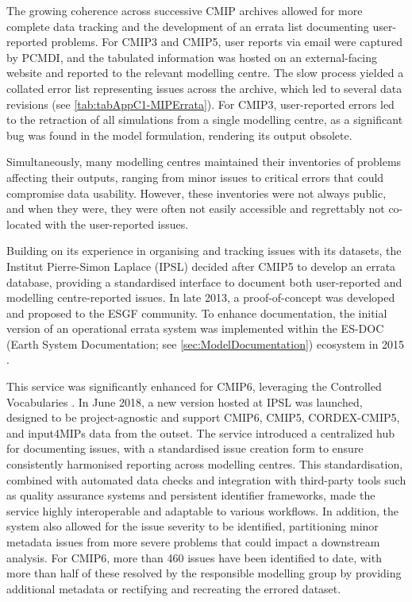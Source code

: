 \documentclass[manuscript]{copernicus}
\begin{document}
The growing coherence across successive CMIP archives allowed for more complete data tracking and the development of an errata list documenting user-reported problems. For CMIP3 and CMIP5, user reports via email were captured by PCMDI, and the tabulated information was hosted on an external-facing website and reported to the relevant modelling centre. The slow process yielded a collated error list representing issues across the archive, which led to several data revisions (see \autoref{tab:tabAppC1-MIPErrata}). For CMIP3, user-reported errors led to the retraction of all simulations from a single modelling centre, as a significant bug was found in the model formulation, rendering its output obsolete.

Simultaneously, many modelling centres maintained their inventories of problems affecting their outputs, ranging from minor issues to critical errors that could compromise data usability. However, these inventories were not always public, and when they were, they were often not easily accessible and regrettably not co-located with the user-reported issues.

Building on its experience in organising and tracking issues with its datasets, the Institut Pierre-Simon Laplace (IPSL) decided after CMIP5 to develop an errata database, providing a standardised interface to document both user-reported and modelling centre-reported issues. In late 2013, a proof-of-concept was developed and proposed to the ESGF community. To enhance documentation, the initial version of an operational errata system was implemented within the ES-DOC (Earth System Documentation; see \autoref{sec:ModelDocumentation}) ecosystem in 2015 \citep{pascoe_documenting_2020}.

This service was significantly enhanced for CMIP6, leveraging the Controlled Vocabularies \citep[see \autoref{sec:CMIPCVs};][]{durack_cmip6_2024}. In June 2018, a new version hosted at IPSL was launched, designed to be project-agnostic and support CMIP6, CMIP5, CORDEX-CMIP5, and input4MIPs data from the outset. The service introduced a centralized hub for documenting issues, with a standardised issue creation form to ensure consistently harmonised reporting across modelling centres. This standardisation, combined with automated data checks and integration with third-party tools such as quality assurance systems and persistent identifier frameworks, made the service highly interoperable and adaptable to various workflows. In addition, the system also allowed for the issue severity to be identified, partitioning minor metadata issues from more severe problems that could impact a downstream analysis. For CMIP6, more than 460 issues have been identified to date, with more than half of these resolved by the responsible modelling group by providing additional metadata or rectifying and recreating the errored dataset.
\end{document}

